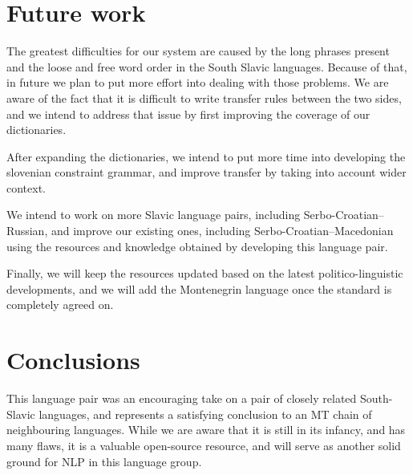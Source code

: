 \section{Future work}

The greatest difficulties for our system are caused by the long phrases present 
and the loose and free word order in the South Slavic languages.
Because of that, in future we plan to put more effort into dealing with those problems.
We are aware of the fact that it is difficult to write transfer rules between the two sides,
and we intend to address that issue by first improving the coverage of our dictionaries.

After expanding the dictionaries, we intend to put more time into developing the slovenian constraint grammar,
and improve transfer by taking into account wider context.

We intend to work on more Slavic language pairs, including Serbo-Croatian--Russian,
and improve our existing ones, including Serbo-Croatian--Macedonian \citep{peradin12} using the 
resources and knowledge obtained by developing this language pair.

Finally, we will keep the resources updated based on the latest politico-linguistic developments,
and we will add the Montenegrin language once the standard is completely agreed on.



\section{Conclusions}

This language pair was an encouraging take on a pair of closely
related South-Slavic languages, and represents a satisfying conclusion
to an MT chain of neighbouring languages. While we are aware that it
is still in its infancy, and has many flaws, it is a valuable
open-source resource, and will serve as another solid ground for NLP
in this language group.

